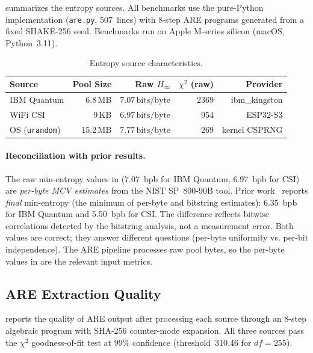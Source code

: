 \documentclass[sigconf,anonymous,review]{acmart}
\theoremstyle{acmdefinition}%
\theoremstyle{acmplain}%
\newcommand{\are}{\textsc{ARE}\xspace}
\newcommand{\minentropy}{H_{\infty}}
\newcommand{\bpb}{\text{bits/byte}}
\begin{document}
 summarizes the entropy sources.
%
All benchmarks use the pure-Python implementation
(\texttt{are.py}, 507~lines) with 8-step \are programs generated
from a fixed SHAKE-256 seed. Benchmarks run on Apple M-series
silicon (macOS, Python~3.11).


\begin{table}[t]
  \centering
  \caption{Entropy source characteristics.}
  \label{tab:sources}
  \begin{tabular}{@{}lrrrr@{}}
    \toprule
    Source & Pool Size & Raw $\minentropy$ & $\chi^2$ (raw) & Provider \\
    \midrule
    IBM Quantum  & 6.8\,MB  & 7.07\,$\bpb$ & 2369 & ibm\_kingston \\
    WiFi CSI     & 9\,KB    & 6.97\,$\bpb$ & 954  & ESP32-S3 \\
    OS (\texttt{urandom}) & 15.2\,MB & 7.77\,$\bpb$ & 269  & kernel CSPRNG \\
    \bottomrule
  \end{tabular}
\end{table}

\paragraph{Reconciliation with prior results.}
The raw min-entropy values in  (7.07~bpb for IBM Quantum, 6.97~bpb for CSI) are \emph{per-byte MCV estimates} from the NIST SP~800-90B tool.
Prior work~\cite{anon2026csi} reports \emph{final} min-entropy (the minimum of per-byte and bitstring estimates): 6.35~bpb for IBM Quantum and 5.50~bpb for CSI.
The difference reflects bitwise correlations detected by the bitstring analysis, not a measurement error.
Both values are correct; they answer different questions (per-byte uniformity vs. per-bit independence).
The \are pipeline processes raw pool bytes, so the per-byte values in  are the relevant input metrics.

\subsection{ARE Extraction Quality}
\label{sec:eval:are}

 reports the quality of \are output after
processing each source through an 8-step algebraic program with
SHA-256 counter-mode expansion.
%
All three sources pass the $\chi^2$ goodness-of-fit test at 99\%
confidence (threshold~310.46 for $df=255$).
\end{document}
